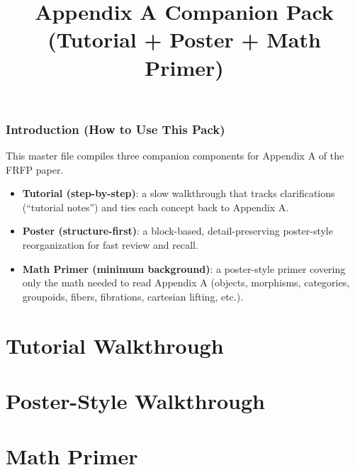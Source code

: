 \documentclass[12pt]{article}
\title{Appendix A Companion Pack (Tutorial + Poster + Math Primer)}
\date{}
\begin{document}
\maketitle

\section*{Introduction (How to Use This Pack)}
This master file compiles three companion components for Appendix A of the FRFP paper.

\begin{itemize}
\item \textbf{Tutorial (step-by-step)}: a slow walkthrough that tracks clarifications (“tutorial notes”) and ties each concept back to Appendix A.
\item \textbf{Poster (structure-first)}: a block-based, detail-preserving poster-style reorganization for fast review and recall.
\item \textbf{Math Primer (minimum background)}: a poster-style primer covering only the math needed to read Appendix A (objects, morphisms, categories, groupoids, fibers, fibrations, cartesian lifting, etc.).
\end{itemize}


\newpage
\tableofcontents
\newpage

\part*{Tutorial Walkthrough}


\part*{Poster-Style Walkthrough}


\part*{Math Primer}

\end{document}
